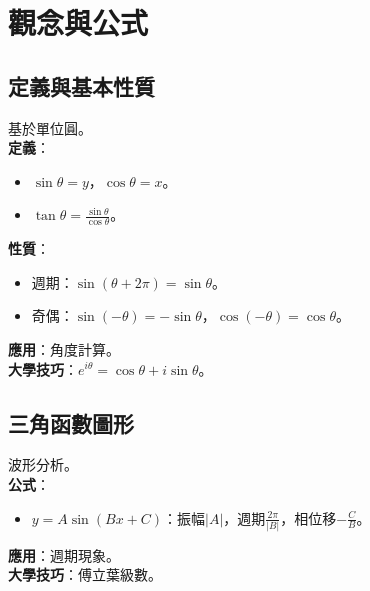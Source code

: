 \section{觀念與公式}

\subsection{定義與基本性質}
基於單位圓。\\
\textbf{定義}：
\begin{itemize}
    \item $\sin \theta = y$，$\cos \theta = x$。
    \item $\tan \theta = \frac{\sin \theta}{\cos \theta}$。
\end{itemize}
\textbf{性質}：
\begin{itemize}
    \item 週期：$\sin(\theta + 2\pi) = \sin \theta$。
    \item 奇偶：$\sin(-\theta) = -\sin \theta$，$\cos(-\theta) = \cos \theta$。
\end{itemize}
\textbf{應用}：角度計算。\\
\textbf{大學技巧}：$e^{i\theta} = \cos \theta + i \sin \theta$。

\subsection{三角函數圖形}
波形分析。\\
\textbf{公式}：
\begin{itemize}
    \item $y = A \sin(Bx + C)$：振幅$|A|$，週期$\frac{2\pi}{|B|}$，相位移$-\frac{C}{B}$。
\end{itemize}
\textbf{應用}：週期現象。\\
\textbf{大學技巧}：傅立葉級數。

